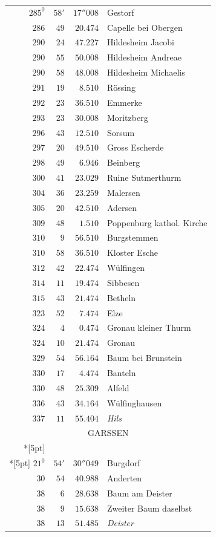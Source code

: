 \clearpage
{}%
\begingroup
\fontsize{10.5}{13}\selectfont
\setlength{\tabcolsep}{3pt}
\setlength{\LTpre}{2pt}
\setlength{\LTpost}{2pt}
\begin{longtable}{@{}rrrp{.61\linewidth}@{}}
\(285^{0}\)&\(58'\)&\(17''008\)&\raggedright Gestorf\tabularnewline
\(286\)&\(49\)&\(20.474\)&\raggedright Capelle bei Obergen\tabularnewline
\(290\)&\(24\)&\(47.227\)&\raggedright Hildesheim Jacobi\tabularnewline
\(290\)&\(55\)&\(50.008\)&\raggedright Hildesheim Andreae\tabularnewline
\(290\)&\(58\)&\(48.008\)&\raggedright Hildesheim Michaelis\tabularnewline
\(291\)&\(19\)&\(8.510\)&\raggedright Rössing\tabularnewline
\(292\)&\(23\)&\(36.510\)&\raggedright Emmerke\tabularnewline
\(293\)&\(23\)&\(30.008\)&\raggedright Moritzberg\tabularnewline
\(296\)&\(43\)&\(12.510\)&\raggedright Sorsum\tabularnewline
\(297\)&\(20\)&\(49.510\)&\raggedright Gross Escherde\tabularnewline
\(298\)&\(49\)&\(6.946\)&\raggedright Beinberg\tabularnewline
\(300\)&\(41\)&\(23.029\)&\raggedright Ruine Sutmerthurm\tabularnewline
\(304\)&\(36\)&\(23.259\)&\raggedright Malersen\tabularnewline
\(305\)&\(20\)&\(42.510\)&\raggedright Adersen\tabularnewline
\(309\)&\(48\)&\(1.510\)&\raggedright Poppenburg kathol. Kirche\tabularnewline
\(310\)&\(9\)&\(56.510\)&\raggedright Burgstemmen\tabularnewline
\(310\)&\(58\)&\(36.510\)&\raggedright Kloster Esche\tabularnewline
\(312\)&\(42\)&\(22.474\)&\raggedright Wülfingen\tabularnewline
\(314\)&\(11\)&\(19.474\)&\raggedright Sibbesen\tabularnewline
\(315\)&\(43\)&\(21.474\)&\raggedright Betheln\tabularnewline
\(323\)&\(52\)&\(7.474\)&\raggedright Elze\tabularnewline
\(324\)&\(4\)&\(0.474\)&\raggedright Gronau kleiner Thurm\tabularnewline
\(324\)&\(10\)&\(21.474\)&\raggedright Gronau\tabularnewline
\(329\)&\(54\)&\(56.164\)&\raggedright Baum bei Brunstein\tabularnewline
\(330\)&\(17\)&\(4.474\)&\raggedright Banteln\tabularnewline
\(330\)&\(48\)&\(25.309\)&\raggedright Alfeld\tabularnewline
\(336\)&\(43\)&\(34.164\)&\raggedright Wülfinghausen\tabularnewline
\(337\)&\(11\)&\(55.404\)&\raggedright \textit{Hils}\tabularnewline
\multicolumn{4}{c}{\strut GARSSEN}\\*[5pt]
\multicolumn{4}{c}{\(-125867.401\)\qquad\(-13888.808\)}\\*[5pt]
\(21^{0}\)&\(54'\)&\(30''049\)&\raggedright Burgdorf\tabularnewline
\(30\)&\(54\)&\(40.988\)&\raggedright Anderten\tabularnewline
\(38\)&\(6\)&\(28.638\)&\raggedright Baum am Deister\tabularnewline
\(38\)&\(9\)&\(15.638\)&\raggedright Zweiter Baum daselbst\tabularnewline
\(38\)&\(13\)&\(51.485\)&\raggedright \textit{Deister}\tabularnewline

\end{longtable}
